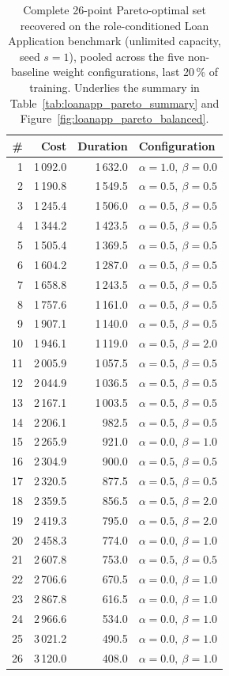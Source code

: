 \begin{table}[H]
\centering
\caption{Complete 26-point Pareto-optimal set recovered on the
role-conditioned Loan Application benchmark (unlimited capacity, seed
$s=1$), pooled across the five non-baseline weight configurations,
last 20\,\% of training. Underlies the summary in
Table~\ref{tab:loanapp_pareto_summary} and
Figure~\ref{fig:loanapp_pareto_balanced}.}
\label{tab:app_loanapp_pareto_points}
\begin{tabular}{rrrl}
\toprule
\textbf{\#} & \textbf{Cost} & \textbf{Duration} & \textbf{Configuration} \\
\midrule
1  & 1\,092.0 & 1\,632.0 & $\alpha=1.0,\ \beta=0.0$ \\
2  & 1\,190.8 & 1\,549.5 & $\alpha=0.5,\ \beta=0.5$ \\
3  & 1\,245.4 & 1\,506.0 & $\alpha=0.5,\ \beta=0.5$ \\
4  & 1\,344.2 & 1\,423.5 & $\alpha=0.5,\ \beta=0.5$ \\
5  & 1\,505.4 & 1\,369.5 & $\alpha=0.5,\ \beta=0.5$ \\
6  & 1\,604.2 & 1\,287.0 & $\alpha=0.5,\ \beta=0.5$ \\
7  & 1\,658.8 & 1\,243.5 & $\alpha=0.5,\ \beta=0.5$ \\
8  & 1\,757.6 & 1\,161.0 & $\alpha=0.5,\ \beta=0.5$ \\
9  & 1\,907.1 & 1\,140.0 & $\alpha=0.5,\ \beta=0.5$ \\
10 & 1\,946.1 & 1\,119.0 & $\alpha=0.5,\ \beta=2.0$ \\
11 & 2\,005.9 & 1\,057.5 & $\alpha=0.5,\ \beta=0.5$ \\
12 & 2\,044.9 & 1\,036.5 & $\alpha=0.5,\ \beta=0.5$ \\
13 & 2\,167.1 & 1\,003.5 & $\alpha=0.5,\ \beta=0.5$ \\
14 & 2\,206.1 &   982.5  & $\alpha=0.5,\ \beta=0.5$ \\
15 & 2\,265.9 &   921.0  & $\alpha=0.0,\ \beta=1.0$ \\
16 & 2\,304.9 &   900.0  & $\alpha=0.5,\ \beta=0.5$ \\
17 & 2\,320.5 &   877.5  & $\alpha=0.5,\ \beta=0.5$ \\
18 & 2\,359.5 &   856.5  & $\alpha=0.5,\ \beta=2.0$ \\
19 & 2\,419.3 &   795.0  & $\alpha=0.5,\ \beta=2.0$ \\
20 & 2\,458.3 &   774.0  & $\alpha=0.0,\ \beta=1.0$ \\
21 & 2\,607.8 &   753.0  & $\alpha=0.5,\ \beta=0.5$ \\
22 & 2\,706.6 &   670.5  & $\alpha=0.0,\ \beta=1.0$ \\
23 & 2\,867.8 &   616.5  & $\alpha=0.0,\ \beta=1.0$ \\
24 & 2\,966.6 &   534.0  & $\alpha=0.0,\ \beta=1.0$ \\
25 & 3\,021.2 &   490.5  & $\alpha=0.0,\ \beta=1.0$ \\
26 & 3\,120.0 &   408.0  & $\alpha=0.0,\ \beta=1.0$ \\
\bottomrule
\end{tabular}
\end{table}
